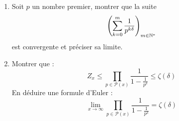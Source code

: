 \begin{enumerate}
 \item Soit $p$ un nombre premier, montrer que la suite
\begin{displaymath}
 \left( \sum_{k=0}^{m}\frac{1}{p^{k\delta}}\right)_{m\in \mathbb{N}^*}
\end{displaymath}
est convergente et préciser sa limite.
\item Montrer que :
\begin{displaymath}
 Z_x \leq \prod_{p\in \mathcal P(x)}\frac{1}{1-\frac{1}{p^\delta}}\leq \zeta(\delta)
\end{displaymath}
En déduire une formule d'Euler :
\begin{displaymath}
 \lim_{x\rightarrow \infty }\prod_{p\in \mathcal P(x)}\frac{1}{1-\frac{1}{p^\delta}}=\zeta(\delta)
\end{displaymath}
\end{enumerate}
